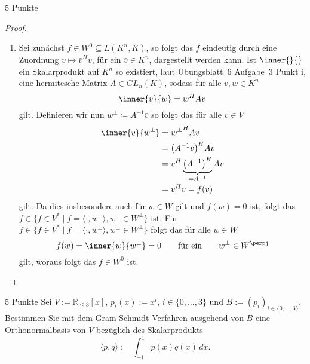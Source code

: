 \documentclass{problemset}
\begin{document}
\begin{problem}{5 Punkte}
\begin{proof}
\begin{enumerate}
        \item Sei zunächst \(f \in W^0 \subseteq L(K^n, K)\), so folgt das
              \(f\) eindeutig durch eine Zuordnung \(v \mapsto \bar{v}^H v\),
              für ein \(\bar{v} \in K^n\), dargestellt werden kann. Ist
              \(\inner{}{}\) ein Skalarprodukt auf \(K^n\) so existiert, laut
              Übungsblatt~6 Aufgabe~3 Punkt i, eine hermitesche Matrix \(A \in
              GL_n(K)\), sodass für alle \(v, w \in K^n\)
              \begin{equation*}
                  \inner{v}{w} = w^H A v
              \end{equation*}
              gilt.
              Definieren wir nun \(w^\perp \coloneq A^{-1} \bar{v}\) so folgt das für alle \(v \in V\)
              \begin{align*}
                  \inner{v}{w^\perp} & = {w^\perp}^H A v                                        \\
                                     & = {\left(A^{-1}v\right)}^H A v                           \\
                                     & = v^H \underbrace{{\left(A^{-1}\right)}^H}_{=A^{-1}} A v \\
                                     & = v^H v = f(v)
              \end{align*}
              gilt.
              Da dies insbesondere auch für \(w \in W\) gilt und \(f(w) = 0\) ist, folgt das \(f \in \{f \in
              V^* \mid f = \langle \cdot , w^\perp \rangle, w^\perp \in W^\perp\}\) ist.
              Für \(f \in \{f \in
              V^* \mid f = \langle \cdot , w^\perp \rangle, w^\perp \in W^\perp\}\) folgt das für alle \(w \in W\)
              \begin{equation*}
                  f(w) = \inner{w}{w^\perp} = 0 \qquad \text{für ein} \qquad w^\perp \in W^\perpj
              \end{equation*}
              gilt, woraus folgt das \(f \in W^0\) ist.
    \end{enumerate}
\end{proof}

\end{problem}

\begin{problem}{5 Punkte}
Sei $V := \mathbb{R}_{\leq 3}[x]$, $p_i(x) := x^i$, $i \in \{0, \ldots, 3\}$
und $B := (p_i)_{i \in \{0, \ldots, 3\}}$. Bestimmen Sie mit dem
Gram-Schmidt-Verfahren ausgehend von $B$ eine Orthonormalbasis von $V$
bezüglich des Skalarprodukts
\[
    \langle p, q \rangle := \int_{-1}^{1} p(x) q(x) \, dx.
\]
\end{problem}
\end{document}

